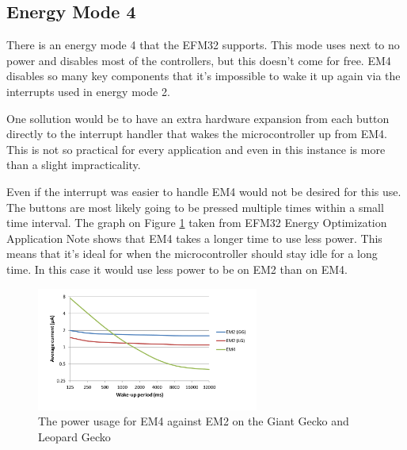 \subsection{Energy Mode 4}
\label{subsec:em4}

There is an energy mode 4 that the EFM32 supports. This mode uses next to no power and disables most of the controllers, but this doesn't come for free. EM4 disables so many key components that it's impossible to wake it up again via the interrupts used in energy mode 2.

One sollution would be to have an extra hardware expansion from each button directly to the interrupt handler that wakes the microcontroller up from EM4. This is not so practical for every application and even in this instance is more than a slight impracticality.

Even if the interrupt was easier to handle EM4 would not be desired for this use. The buttons are most likely going to be pressed multiple times within a small time interval. The graph on Figure \ref{fig:em4} taken from EFM32 Energy Optimization Application Note \cite{efm32-energy-op} shows that EM4 takes a longer time to use less power. This means that it's ideal for when the microcontroller should stay idle for a long time. In this case it would use less power to be on EM2 than on EM4.

\begin{figure}[h!]
    \begin{center}
    \includegraphics[width=0.65\textwidth]{assets/img/em4.png}
    \caption{The power usage for EM4 against EM2 on the Giant Gecko and Leopard Gecko}
    \label{fig:em4}
    \end{center}
\end{figure}
